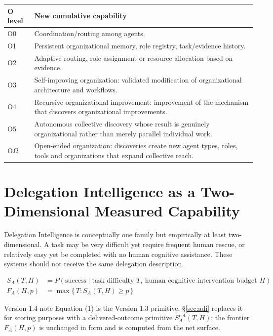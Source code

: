 \documentclass[11pt]{article}
\theoremstyle{definition}
\newcommand{\Om}{\ensuremath{\Omega}}
\newcommand{\SA}{\ensuremath{S_A(T,H)}}
\newcommand{\FA}{\ensuremath{F_A(H,p)}}
\begin{document}
\begin{table}[h]
\centering\small
\begin{tabularx}{\textwidth}{@{}lY@{}}
\toprule
O level & New cumulative capability \\
\midrule
O0 & Coordination/routing among agents. \\
O1 & Persistent organizational memory, role registry, task/evidence history. \\
O2 & Adaptive routing, role assignment or resource allocation based on evidence. \\
O3 & Self-improving organization: validated modification of organizational architecture and workflows. \\
O4 & Recursive organizational improvement: improvement of the mechanism that discovers organizational improvements. \\
O5 & Autonomous collective discovery whose result is genuinely organizational rather than merely parallel individual work. \\
O\Om{} & Open-ended organization: discoveries create new agent types, roles, tools and organizations that expand collective reach. \\
\bottomrule
\end{tabularx}
\end{table}

\section{Delegation Intelligence as a Two-Dimensional Measured Capability}

Delegation Intelligence is conceptually one family but empirically at least two-dimensional. A task may be very difficult yet require frequent human rescue, or relatively easy yet be completed with no human cognitive assistance. These systems should not receive the same delegation description.

\begin{align}
\SA{} &= P(\text{success} \mid \text{task difficulty } T,\ \text{human cognitive intervention budget } H)\\
\FA{} &= \max\{\,T : \SA{} \ge p\,\}
\end{align}

\begin{addedbox}{Version 1.4 note}
Equation (1) is the Version 1.3 primitive. \S\ref{sec:adi} replaces it for scoring purposes with a delivered-outcome primitive $S^{\text{net}}_A(T,H)$; the frontier \FA{} is unchanged in form and is computed from the net surface.
\end{addedbox}
\end{document}
